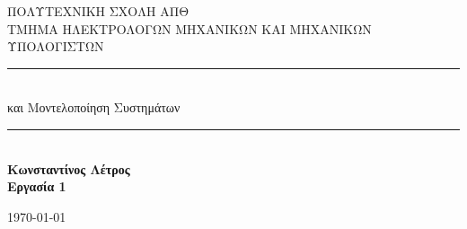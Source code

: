 \documentclass[12pt]{article}
\begin{document}
\author{Κωνσταντίνος Λέτρος 8851}

 \begin{titlepage} %
	\newcommand{\HRule}{\rule{\linewidth}{0.5mm}} %
	
	\center %
	
	
	\textsc{\LARGE ΠΟΛΥΤΕΧΝΙΚΗ ΣΧΟΛΗ ΑΠΘ}\\[1.5cm] %
	
	\textsc{\Large ΤΜΗΜΑ ΗΛΕΚΤΡΟΛΟΓΩΝ ΜΗΧΑΝΙΚΩΝ ΚΑΙ ΜΗΧΑΝΙΚΩΝ ΥΠΟΛΟΓΙΣΤΩΝ}\\[0.5cm] %
	
	 
	
	
	\HRule\\[0.4cm]
	
	{\huge{} και Μοντελοποίηση Συστημάτων}\\[0.4cm] %
	
	\HRule\\[1.5cm]
	
	{\huge\bfseries Κωνσταντίνος Λέτρος }\\[0.4cm]	
	\vfill	
	{\huge\bfseries Εργασία 1}\\[0.4cm]  %
	
	
	\vfill\vfill\vfill %
	
	{\large\today} %
	
	
	 
	
	\vfill %
	
\end{titlepage}
\end{document}
